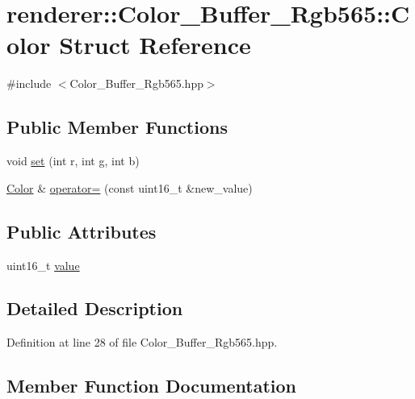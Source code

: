 \hypertarget{structrenderer_1_1_color___buffer___rgb565_1_1_color}{}\section{renderer\+::Color\+\_\+\+Buffer\+\_\+\+Rgb565\+::Color Struct Reference}
\label{structrenderer_1_1_color___buffer___rgb565_1_1_color}


{\ttfamily \#include $<$Color\+\_\+\+Buffer\+\_\+\+Rgb565.\+hpp$>$}

\subsection*{Public Member Functions}
\begin{DoxyCompactItemize}
\item 
void \mbox{\hyperlink{structrenderer_1_1_color___buffer___rgb565_1_1_color_a9b751a4c9af850c41602fef7afc67440}{set}} (int r, int g, int b)
\item 
\mbox{\hyperlink{structrenderer_1_1_color___buffer___rgb565_1_1_color}{Color}} \& \mbox{\hyperlink{structrenderer_1_1_color___buffer___rgb565_1_1_color_a2c5bd86793ffe45bbc030ee0bcf70298}{operator=}} (const uint16\+\_\+t \&new\+\_\+value)
\end{DoxyCompactItemize}
\subsection*{Public Attributes}
\begin{DoxyCompactItemize}
\item 
uint16\+\_\+t \mbox{\hyperlink{structrenderer_1_1_color___buffer___rgb565_1_1_color_a392aacf0da0ba11ef240e66a55816971}{value}}
\end{DoxyCompactItemize}


\subsection{Detailed Description}


Definition at line 28 of file Color\+\_\+\+Buffer\+\_\+\+Rgb565.\+hpp.



\subsection{Member Function Documentation}
\mbox{\label{structrenderer_1_1_color___buffer___rgb565_1_1_color_a2c5bd86793ffe45bbc030ee0bcf70298}} 
